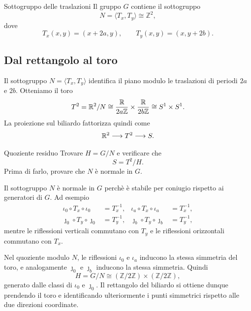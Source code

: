 \documentclass[a4paper]{article}
\begin{document}
\begin{snippetcorollary}{Sottogruppo delle traslazioni}
Il gruppo \(G\) contiene il sottogruppo
\[
    N=\langle T_x,T_y\rangle
    \cong \mathbb{Z}^2,
\]
dove
\[
    T_x(x,y)=(x+2a,y),
    \qquad
    T_y(x,y)=(x,y+2b).
\]
\end{snippetcorollary}

\subsection{Dal rettangolo al toro}

Il sottogruppo \(N=\langle T_x,T_y\rangle\) identifica il piano modulo le traslazioni di periodi \(2a\) e \(2b\). Otteniamo il toro
\[
    T^2
    =
    \mathbb{R}^2/N
    \cong
    \frac{\mathbb{R}}{2a\mathbb{Z}}\times \frac{\mathbb{R}}{2b\mathbb{Z}}
    \cong
    S^1\times S^1.
\]
La proiezione sul biliardo fattorizza quindi come
\[
    \mathbb{R}^2 \longrightarrow T^2 \longrightarrow S.
\]


\begin{snippetexercise}{Quoziente residuo}
Trovare \(H=G/N\) e verificare che
\[
    S=T^2/H.
\]
Prima di farlo, provare che \(N\) è normale in \(G\).
\end{snippetexercise}

\begin{snippetsolution}{}
Il sottogruppo \(N\) è normale in \(G\) perchè è stabile per coniugio rispetto ai generatori di \(G\). Ad esempio
\begin{align*}
    \iota_0\circ T_x\circ \iota_0&=T_x^{-1},
    &
    \iota_a\circ T_x\circ \iota_a&=T_x^{-1},\\
    \jmath_0\circ T_y\circ \jmath_0&=T_y^{-1},
    &
    \jmath_b\circ T_y\circ \jmath_b&=T_y^{-1},
\end{align*}
mentre le riflessioni verticali commutano con \(T_y\) e le riflessioni orizzontali commutano con \(T_x\).

Nel quoziente modulo \(N\), le riflessioni \(\iota_0\) e \(\iota_a\) inducono la stessa simmetria del toro, e analogamente \(\jmath_0\) e \(\jmath_b\) inducono la stessa simmetria. Quindi
\[
    H=G/N
    \cong
    (\mathbb{Z}/2\mathbb{Z})\times (\mathbb{Z}/2\mathbb{Z}),
\]
generato dalle classi di \(\iota_0\) e \(\jmath_0\). Il rettangolo del biliardo si ottiene dunque prendendo il toro e identificando ulteriormente i punti simmetrici rispetto alle due direzioni coordinate.
\end{snippetsolution}
\end{document}

